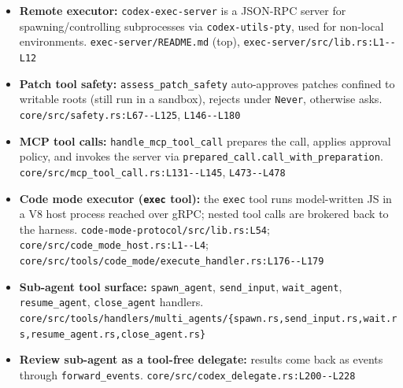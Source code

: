 \begin{itemize}
\item \textbf{Remote executor:} \texttt{codex-\allowbreak{}exec-\allowbreak{}server} is a JSON-RPC server for spawning/controlling subprocesses via \texttt{codex-\allowbreak{}utils-\allowbreak{}pty}, used for non-local environments. \texttt{exec-\allowbreak{}server/\allowbreak{}README.\allowbreak{}md} (top), \texttt{exec-\allowbreak{}server/\allowbreak{}src/\allowbreak{}lib.\allowbreak{}rs:\allowbreak{}L1-\allowbreak{}-\allowbreak{}L12}
\item \textbf{Patch tool safety:} \texttt{assess\_\allowbreak{}patch\_\allowbreak{}safety} auto-approves patches confined to writable roots (still run in a sandbox), rejects under \texttt{Never}, otherwise asks. \texttt{core/\allowbreak{}src/\allowbreak{}safety.\allowbreak{}rs:\allowbreak{}L67-\allowbreak{}-\allowbreak{}L125}, \texttt{L146-\allowbreak{}-\allowbreak{}L180}
\item \textbf{MCP tool calls:} \texttt{handle\_\allowbreak{}mcp\_\allowbreak{}tool\_\allowbreak{}call} prepares the call, applies approval policy, and invokes the server via \texttt{prepared\_\allowbreak{}call.\allowbreak{}call\_\allowbreak{}with\_\allowbreak{}preparation}. \texttt{core/\allowbreak{}src/\allowbreak{}mcp\_\allowbreak{}tool\_\allowbreak{}call.\allowbreak{}rs:\allowbreak{}L131-\allowbreak{}-\allowbreak{}L145}, \texttt{L473-\allowbreak{}-\allowbreak{}L478}
\item \textbf{Code mode executor (\texttt{exec} tool):} the \texttt{exec} tool runs model-written JS in a V8 host process reached over gRPC; nested tool calls are brokered back to the harness. \texttt{code-\allowbreak{}mode-\allowbreak{}protocol/\allowbreak{}src/\allowbreak{}lib.\allowbreak{}rs:\allowbreak{}L54}; \texttt{core/\allowbreak{}src/\allowbreak{}code\_\allowbreak{}mode\_\allowbreak{}host.\allowbreak{}rs:\allowbreak{}L1-\allowbreak{}-\allowbreak{}L4}; \texttt{core/\allowbreak{}src/\allowbreak{}tools/\allowbreak{}code\_\allowbreak{}mode/\allowbreak{}execute\_\allowbreak{}handler.\allowbreak{}rs:\allowbreak{}L176-\allowbreak{}-\allowbreak{}L179}
\item \textbf{Sub-agent tool surface:} \texttt{spawn\_\allowbreak{}agent}, \texttt{send\_\allowbreak{}input}, \texttt{wait\_\allowbreak{}agent}, \texttt{resume\_\allowbreak{}agent}, \texttt{close\_\allowbreak{}agent} handlers. \texttt{core/\allowbreak{}src/\allowbreak{}tools/\allowbreak{}handlers/\allowbreak{}multi\_\allowbreak{}agents/\allowbreak{}\{spawn.\allowbreak{}rs,send\_\allowbreak{}input.\allowbreak{}rs,wait.\allowbreak{}rs,resume\_\allowbreak{}agent.\allowbreak{}rs,close\_\allowbreak{}agent.\allowbreak{}rs\}}
\item \textbf{Review sub-agent as a tool-free delegate:} results come back as events through \texttt{forward\_\allowbreak{}events}. \texttt{core/\allowbreak{}src/\allowbreak{}codex\_\allowbreak{}delegate.\allowbreak{}rs:\allowbreak{}L200-\allowbreak{}-\allowbreak{}L228}
\end{itemize}

